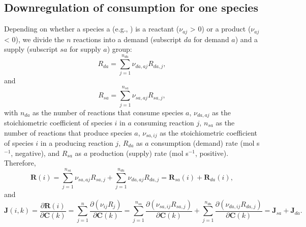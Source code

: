 \documentclass[gmd, manuscript]{copernicus}
\begin{document}
\subsection{Downregulation of consumption for one species}
Depending on whether a species a (e.g., ) is a reactant
($\nu_{aj}$ > 0) or a product ($\nu_{aj}$ < 0), we divide the $n$ reactions into a
demand (subscript $da$ for demand $a$) and a supply (subscript $sa$ for supply
$a$) group:
\begin{equation}
R_{da}=\sum_{j=1}^{n_{da}} \nu_{da,aj} R_{da,j},
\end{equation}
and
\begin{equation}
R_{sa}=\sum_{j=1}^{n_{sa}} \nu_{sa,aj} R_{sa,j},
\end{equation}
with $n_{da}$ as the number of reactions that consume species $a$,
$\nu_{da,aj}$ as the stoichiometric coefficient of species $i$ in $a$ consuming
reaction $j$, $n_{sa}$ as the number of reactions that produce species $a$,
$\nu_{sa,ij}$ as the stoichiometric coefficient of species $i$ in a producing
reaction $j$, $R_{da}$ as $a$ consumption (demand) rate (mol s$^{-1}$,
negative), and $R_{sa}$ as $a$ production (supply) rate (mol s$^{-1}$,
positive). Therefore, 
\begin{equation}
\mathbf{R}(i) = \sum_{j=1}^{n_{sa}} \nu_{sa,aj} R_{sa,j} + \sum_{j=1}^{n_{da}}
\nu_{da,aj} R_{da,j}=\mathbf{R}_{sa} (i)+\mathbf{R}_{da} (i),
\end{equation}
and
\begin{equation}
\mathbf{J}(i,k)=\frac{\partial \mathbf{R}(i)}{\partial \mathbf{C}(k)}
=\sum_{j=1}^n \frac{\partial (\nu_{ij}R_j)}{\partial \mathbf{C}(k)} =
\sum_{j=1}^{n_{sa}} \frac{\partial (\nu_{sa,ij}R_{sa,j})}{\partial
\mathbf{C}(k)} + \sum_{j=1}^{n_{da}} \frac{\partial
(\nu_{da,ij}R_{da,j})}{\partial \mathbf{C}(k)} =
\mathbf{J}_{sa}+\mathbf{J}_{da}.
\end{equation}
\end{document}
